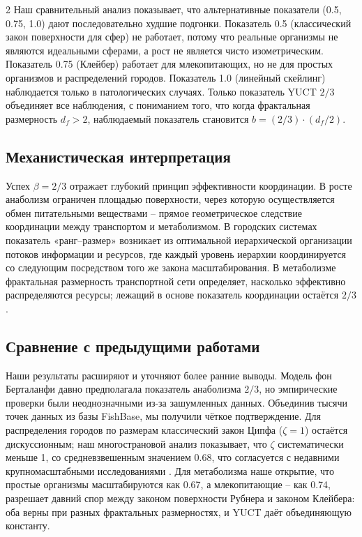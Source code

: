 \documentclass[11pt,a4paper]{article}
\newcommand{\df}{d_f}
\begin{document}
\begin{multicols}{2}
		Наш сравнительный анализ показывает, что альтернативные показатели (0.5, 0.75, 1.0) дают последовательно худшие подгонки. Показатель 0.5 (классический закон поверхности для сфер) не работает, потому что реальные организмы не являются идеальными сферами, а рост не является чисто изометрическим. Показатель 0.75 (Клейбер) работает для млекопитающих, но не для простых организмов и распределений городов. Показатель 1.0 (линейный скейлинг) наблюдается только в патологических случаях. Только показатель YUCT \(2/3\) объединяет все наблюдения, с пониманием того, что когда фрактальная размерность \(\df > 2\), наблюдаемый показатель становится \(b = (2/3) \cdot (\df/2)\).
		
		\subsection{Механистическая интерпретация}
		
		Успех \(\beta = 2/3\) отражает глубокий принцип эффективности координации. В росте анаболизм ограничен площадью поверхности, через которую осуществляется обмен питательными веществами – прямое геометрическое следствие координации между транспортом и метаболизмом. В городских системах показатель «ранг–размер» возникает из оптимальной иерархической организации потоков информации и ресурсов, где каждый уровень иерархии координируется со следующим посредством того же закона масштабирования. В метаболизме фрактальная размерность транспортной сети определяет, насколько эффективно распределяются ресурсы; лежащий в основе показатель координации остаётся \(2/3\).
		
		\subsection{Сравнение с предыдущими работами}
		
		Наши результаты расширяют и уточняют более ранние выводы. Модель фон Берталанфи давно предполагала показатель анаболизма \(2/3\), но эмпирические проверки были неоднозначными из-за зашумленных данных. Объединив тысячи точек данных из базы FishBase, мы получили чёткое подтверждение. Для распределения городов по размерам классический закон Ципфа (\(\zeta = 1\)) остаётся дискуссионным; наш многострановой анализ показывает, что \(\zeta\) систематически меньше 1, со средневзвешенным значением 0.68, что согласуется с недавними крупномасштабными исследованиями \cite{Gabaix2016}. Для метаболизма наше открытие, что простые организмы масштабируются как 0.67, а млекопитающие – как 0.74, разрешает давний спор между законом поверхности Рубнера и законом Клейбера: оба верны при разных фрактальных размерностях, и YUCT даёт объединяющую константу.
		

\end{multicols}
\end{document}
